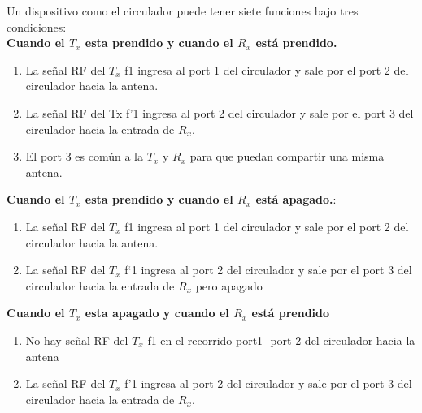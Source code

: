 \documentclass[
	12pt, %
	fleqn, %
	a4paper, %
	oneside, %
]{LegrandOrangeBook}
\begin{document}
\begin{example}
Un dispositivo como el circulador puede tener siete funciones bajo tres condiciones:\\
\textbf{Cuando el $T_x$ esta prendido y cuando el $R_x$ está prendido.}
\begin{enumerate}
\item La señal RF del $T_x$ f1 ingresa al port 1 del circulador y sale por el port 2 del circulador
hacia la antena.
\item La señal RF del Tx f'1 ingresa al port 2 del circulador y sale por el port 3 del circulador
hacia la entrada de $R_x$.
\item El port 3 es común a la $T_x$ y $R_x$ para que puedan compartir una misma antena.
\end{enumerate}
\textbf{Cuando el $T_x$ esta prendido y cuando el $R_x$ está apagado.}:
\begin{enumerate}
\item La señal RF del $T_x$ f1 ingresa al port 1 del circulador y sale por el port 2 del circulador
hacia la antena.
\item La señal RF del $T_x$ f`1 ingresa al port 2 del circulador y sale por el port 3 del circulador
hacia la entrada de $R_x$ pero apagado
\end{enumerate}
\textbf{Cuando el $T_x$ esta apagado y cuando el $R_x$ está prendido}
\begin{enumerate}
\item No hay señal RF del $T_x$ f1 en el recorrido port1 -port 2 del circulador hacia la antena
\item La señal RF del $T_x$ f'1 ingresa al port 2 del circulador y sale por el port 3 del circulador hacia
la entrada de $R_x$.
\end{enumerate}
\end{example}
\end{document}
